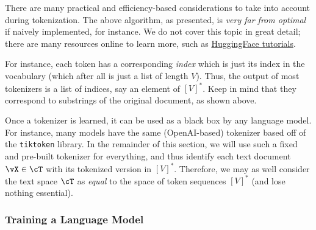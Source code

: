 \documentclass[../../book-main.tex]{subfiles}
\begin{document}
There are many practical and efficiency-based considerations to take into account during tokenization. The above algorithm, as presented, is \textit{very far from optimal} if naively implemented, for instance. We do not cover this topic in great detail; there are many resources online to learn more, such as \href{https://huggingface.co/learn/nlp-course/en/chapter6/5}{HuggingFace tutorials}.

For instance, each token has a corresponding \textit{index} which is just its index in the vocabulary (which after all is just a list of length \(V\)). Thus, the output of most tokenizers is a list of indices, say an element of \([V]^{*}\). Keep in mind that they correspond to substrings of the original document, as shown above.

Once a tokenizer is learned, it can be used as a black box by any language model. For instance, many models have the same (OpenAI-based) tokenizer based off of the \texttt{tiktoken} library. In the remainder of this section, we will use such a fixed and pre-built tokenizer for everything, and thus identify each text document \(\vX \in \cT\) with its tokenized version in \([V]^{*}\). Therefore, we may as well consider the text space \(\cT\) as \textit{equal} to the space of token sequences \([V]^{*}\) (and lose nothing essential).

\subsubsection{Training a Language Model}
\end{document}
